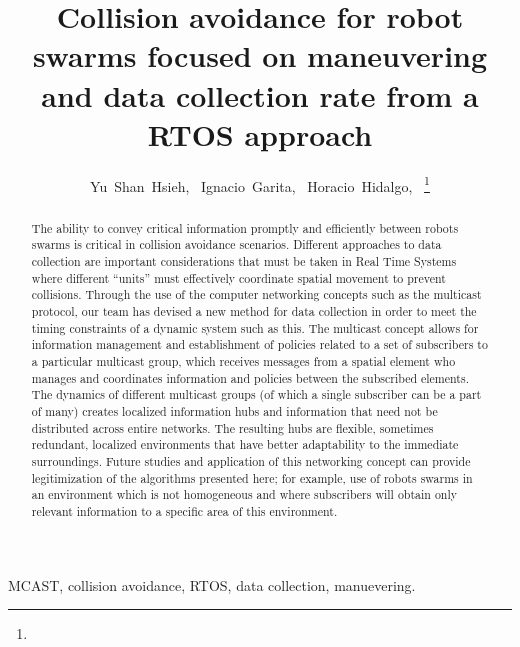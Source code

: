 \documentclass[journal]{IEEEtran}
\begin{document}
\title{Collision avoidance for robot swarms focused on maneuvering and data collection rate from a RTOS approach}

\author{Yu~Shan~Hsieh,~
	Ignacio~Garita,~
        Horacio~Hidalgo,~%
\thanks{}%
%
}

\maketitle

\begin{abstract}
The ability to convey critical information promptly and efficiently between robots
swarms is critical in collision avoidance scenarios. Different approaches to data collection
are important considerations that must be taken in Real Time Systems where different “units” must
effectively coordinate spatial movement to prevent collisions. Through the use of the computer
networking concepts such as the multicast protocol, our team has devised a new method for
data collection in order to meet the timing constraints of a dynamic system such as this. The multicast
concept allows for information management and establishment of policies related to a set of
subscribers to a particular multicast group, which receives messages from a spatial element who
manages and coordinates information and policies between the subscribed elements. The dynamics
of different multicast groups (of which a single subscriber can be a part of many) creates localized
information hubs and information that need not be distributed across entire networks. The resulting
hubs are flexible, sometimes redundant, localized environments that have better adaptability
to the immediate surroundings. Future studies and application of this networking concept can
provide legitimization of the algorithms presented here; for example, use of robots swarms in an
environment which is not homogeneous and where subscribers will obtain only relevant information
to a specific area of this environment.
\end{abstract}

\begin{IEEEkeywords}
MCAST, collision avoidance, RTOS, data collection, manuevering.
\end{IEEEkeywords}
\end{document}
